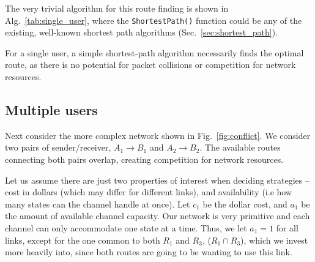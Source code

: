 \documentclass[aps,rmp,twocolumn,amsmath,amssymb,nofootinbib,superscriptaddress,longbibliography,floatfix]{revtex4-1}
\begin{document}
The very trivial algorithm for this route finding is shown in Alg.~\ref{tab:single_user}, where the {\tt ShortestPath()} function could be any of the existing, well-known shortest path algorithms (Sec.~\ref{sec:shortest_path}).
\begin{table}[!htb]
\caption{For a single user, a simple shortest-path algorithm necessarily finds the optimal route, as there is no potential for packet collisions or competition for network resources.} \label{tab:single_user}
\end{table}

%
%

\subsection{Multiple users} \label{sec:two_user}

Next consider the more complex network shown in Fig.~\ref{fig:conflict}. We consider two pairs of sender/receiver, \mbox{$A_1\to B_1$} and \mbox{$A_2\to B_2$}. The available routes connecting both pairs overlap, creating competition for network resources.

Let us assume there are just two properties of interest when deciding strategies -- cost in dollars (which may differ for different links), and availability (i.e how many states can the channel handle at once). Let $c_1$ be the dollar cost, and \mbox{$a_1$} be the amount of available channel capacity. Our network is very primitive and each channel can only accommodate one state at a time. Thus, we let \mbox{$a_1=1$} for all links, except for the one common to both $R_1$ and $R_3$, \mbox{($R_1\cap R_3$)}, which we invest more heavily into, since both routes are going to be wanting to use this link.
\end{document}
